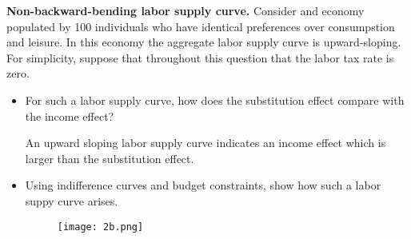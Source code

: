 \documentclass[11pt]{SelfArxOneColBMN}
\begin{document}
\begin{exercise}
	\textbf{Non-backward-bending labor supply curve.} Consider and economy populated by 100 individuals who have identical preferences over consumpstion and leisure. In this economy the aggregate labor supply curve is upward-sloping. For simplicity, suppose that throughout this question that the labor tax rate is zero.
\begin{itemize}
	\item For such a labor supply curve, how does the substitution effect compare with the income effect?
		\begin{solution}
			An upward sloping labor supply curve indicates an income effect which is larger than the substitution effect.
		\end{solution}
	\item Using indifference curves and budget constraints, show how such a labor suppy curve arises. 
        	\begin{figure}
			\texttt{[image: 2b.png]}
        	\end{figure}
\end{itemize}
\end{exercise}
\pagebreak
\end{document}
